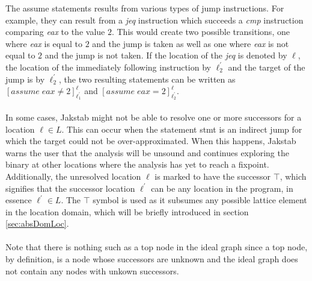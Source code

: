 \documentclass{kththesis}
\renewcommand{\it}[1]{\textit{#1}}
\begin{document}
The assume statements results from various types of jump instructions. For example, they can result from a \it{jeq} instruction which succeeds a \it{cmp} instruction comparing \it{eax} to the value $2$. This would create two possible transitions, one where \it{eax} is equal to $2$ and the jump is taken as well as one where \it{eax} is not equal to $2$ and the jump is not taken. If the location of the \it{jeq} is denoted by $\ell$, the location of the immediately following instruction by $\ell^{'}_{2}$ and the target of the jump is by $\ell^{'}_{2}$, the two resulting statements can be written as $[assume\;eax \neq 2]^{\ell}_{\ell^{'}_{1}}$ and $[assume\;eax = 2]^{\ell}_{\ell^{'}_{2}}$.
\\ \\
In some cases, Jakstab might not be able to resolve one or more successors for a location $\ell \in L$. This can occur when the statement stmt is an indirect jump for which the target could not be over-approximated. When this happens, Jakstab warns the user that the analysis will be unsound and continues exploring the binary at other locations where the analysis has yet to reach a fixpoint. Additionally, the unresolved location $\ell$ is marked to have the successor $\top$, which signifies that the successor location $\ell^{'}$ can be any location in the program, in essence $\ell^{'} \in L$. The $\top$ symbol is used as it subsumes any possible lattice element in the location domain, which will be briefly introduced in section \ref{sec:absDomLoc}. 
\\ \\ 
Note that there is nothing such as a top node in the ideal graph since a top node, by definition, is a node whose successors are unknown and the ideal graph does not contain any nodes with unkown successors.



\end{document}

